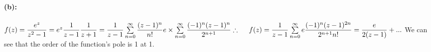 \documentclass[fleqn]{article}
\begin{document}
\begin{enumerate}
{        \\
        \\
        \textbf{(b):}
        \\
        \\
        $
          f(z)=\dfrac{e^z}{z^2-1}=e^z \dfrac{1}{z-1} \dfrac{1}{z+1}
          \\
          \\
          =\dfrac{1}{z-1} \sum\limits_{n=0}^{\infty} \dfrac{(z-1)^n}{n!} e \times \sum\limits_{n=0}^{\infty} \dfrac{(-1)^n (z-1)^n}{2^{n+1}}
          \\
          \\
          \\
          \therefore ~~~~ f(z)=\dfrac{1}{z-1} \sum\limits_{n=0}^{\infty} e \dfrac{(-1)^n (z-1)^{2n}}{2^{n+1} n!}=\dfrac{e}{2(z-1)}+...
        $
        We can see that the order of the function's pole is 1 at 1.
      }

  \end{enumerate}

  \pagebreak
\end{document}
